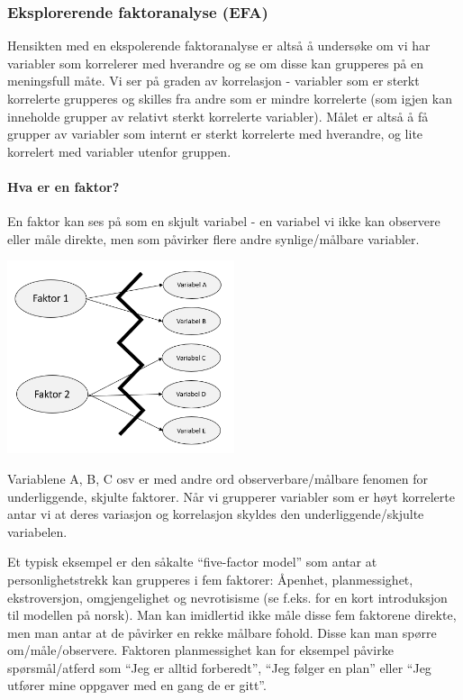 \documentclass[
]{article}
\begin{document}
\hypertarget{eksplorerende-faktoranalyse-efa}{%
\subsubsection{Eksplorerende faktoranalyse (EFA)}\label{eksplorerende-faktoranalyse-efa}}

Hensikten med en ekspolerende faktoranalyse er altså å undersøke om vi har variabler som korrelerer med hverandre og se om disse kan grupperes på en meningsfull måte. Vi ser på graden av korrelasjon - variabler som er sterkt korrelerte grupperes og skilles fra andre som er mindre korrelerte (som igjen kan inneholde grupper av relativt sterkt korrelerte variabler). Målet er altså å få grupper av variabler som internt er sterkt korrelerte med hverandre, og lite korrelert med variabler utenfor gruppen.

\hypertarget{hva-er-en-faktor}{%
\paragraph{Hva er en faktor?}\label{hva-er-en-faktor}}

En faktor kan ses på som en skjult variabel - en variabel vi ikke kan observere eller måle direkte, men som påvirker flere andre synlige/målbare variabler.

\includegraphics[width=0.5\textwidth,height=\textheight]{faktoranalyse.png}

Variablene A, B, C osv er med andre ord observerbare/målbare fenomen for underliggende, skjulte faktorer. Når vi grupperer variabler som er høyt korrelerte antar vi at deres variasjon og korrelasjon skyldes den underliggende/skjulte variabelen.

Et typisk eksempel er den såkalte ``five-factor model'' \citep{mccraeIntroductionFiveFactorModel1992} som antar at personlighetstrekk kan grupperes i fem faktorer: Åpenhet, planmessighet, ekstroversjon, omgjengelighet og nevrotisisme (se f.eks. \citet{kennairFemfaktormodellen2021} for en kort introduksjon til modellen på norsk). Man kan imidlertid ikke måle disse fem faktorene direkte, men man antar at de påvirker en rekke målbare fohold. Disse kan man spørre om/måle/observere. Faktoren planmessighet kan for eksempel påvirke spørsmål/atferd som ``Jeg er alltid forberedt'', ``Jeg følger en plan'' eller ``Jeg utfører mine oppgaver med en gang de er gitt''.
\end{document}
